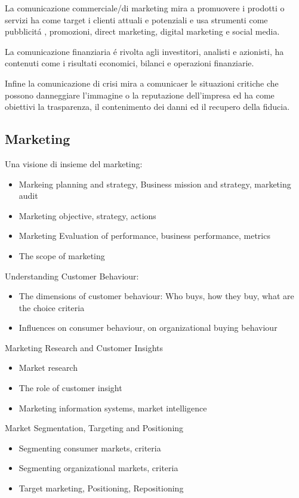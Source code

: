 \documentclass{article}
\begin{document}
La comunicazione commerciale/di marketing mira a promuovere i prodotti o servizi ha come target i clienti attuali e potenziali e usa strumenti come pubblicit\'a , promozioni, direct marketing, digital marketing e social media.

La comunicazione finanziaria \'e rivolta agli investitori, analisti e azionisti, ha contenuti come i risultati economici, bilanci e operazioni finanziarie. 

Infine la comunicazione di crisi mira a comunicaer le situazioni critiche che possono danneggiare l'immagine o la reputazione dell'impresa ed ha come obiettivi la trasparenza, il contenimento dei danni ed il recupero della fiducia.

\subsection{Marketing}
Una visione di insieme del marketing:

\begin{itemize}
    \item Markeing planning and strategy, Business mission and strategy, marketing audit
    \item Marketing objective, strategy, actions
    \item Marketing Evaluation of performance, business performance, metrics
    \item The scope of marketing
\end{itemize}

Understanding Customer Behaviour:
\begin{itemize}
    \item The dimensions of customer behaviour: Who buys, how they buy, what are the choice criteria
    \item  Influences on consumer behaviour, on organizational buying behaviour
\end{itemize}

Marketing Research and Customer Insights
\begin{itemize}
    \item Market research
    \item The role of customer insight
    \item Marketing information systems, market intelligence
\end{itemize}

Market Segmentation, Targeting and Positioning
\begin{itemize}
    \item Segmenting consumer markets, criteria
    \item Segmenting organizational markets, criteria
    \item Target marketing, Positioning, Repositioning
\end{itemize}
\end{document}
